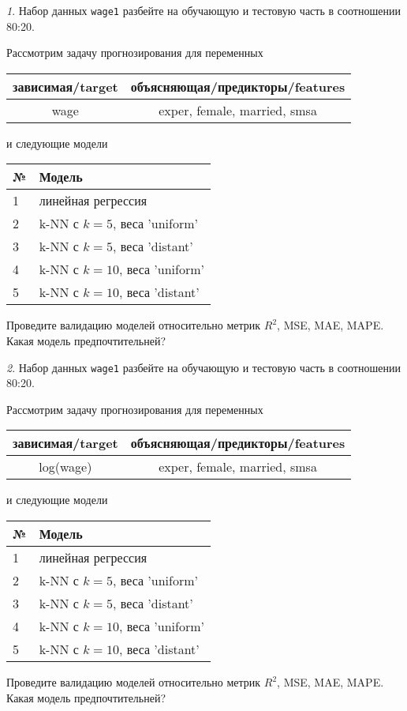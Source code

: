 \documentclass[12pt]{article}
\theoremstyle{remark}
\newtheorem{exercise}{}[section]
\begin{document}
\begin{exercise}
Набор данных \texttt{wage1} разбейте на обучающую и тестовую часть
в соотношении 80:20.

Рассмотрим задачу прогнозирования для переменных
\begin{center}
	\begin{tabular}{|c|c|}\hline
		зависимая/target & объясняющая/предикторы/features \\ \hline
		wage & exper, female, married, smsa \\ \hline
	\end{tabular}
\end{center}
и следующие модели
\begin{center}
	\begin{tabular}{|l|l|}\hline
		№ & Модель \\ \hline
		1 & линейная регрессия\\
		2 & k-NN с \(k=5\), веса 'uniform' \\
		3 & k-NN с \(k=5\), веса 'distant' \\
		4 & k-NN с \(k=10\), веса 'uniform' \\
		5 & k-NN с \(k=10\), веса 'distant' \\ \hline
	\end{tabular}
\end{center}
Проведите валидацию моделей относительно метрик \(R^2\), MSE, MAE,
MAPE. Какая модель предпочтительней?
\end{exercise}

\begin{exercise}
Набор данных \texttt{wage1} разбейте на обучающую и тестовую часть
в соотношении 80:20.

Рассмотрим задачу прогнозирования для переменных
\begin{center}
	\begin{tabular}{|c|c|}\hline
		зависимая/target & объясняющая/предикторы/features \\ \hline
		log(wage) & exper, female, married, smsa \\ \hline
	\end{tabular}
\end{center}
и следующие модели
\begin{center}
	\begin{tabular}{|l|l|}\hline
		№ & Модель \\ \hline
		1 & линейная регрессия\\
		2 & k-NN с \(k=5\), веса 'uniform' \\
		3 & k-NN с \(k=5\), веса 'distant' \\
		4 & k-NN с \(k=10\), веса 'uniform' \\
		5 & k-NN с \(k=10\), веса 'distant' \\ \hline
	\end{tabular}
\end{center}
Проведите валидацию моделей относительно метрик \(R^2\), MSE, MAE,
MAPE. Какая модель предпочтительней?
\end{exercise}
\end{document}

